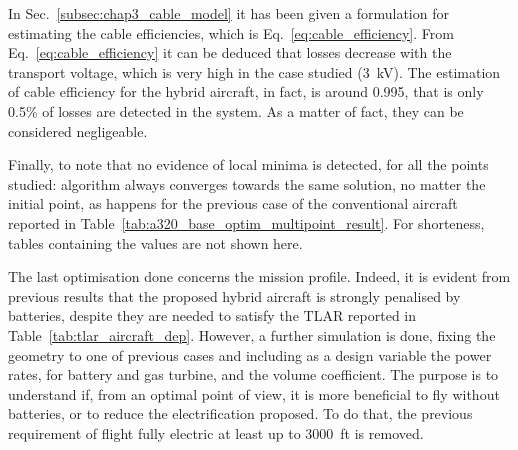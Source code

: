 In Sec.~\ref{subsec:chap3_cable_model} it has been given a formulation for estimating the cable efficiencies, which is Eq.~\eqref{eq:cable_efficiency}. 
From Eq.~\eqref{eq:cable_efficiency} it can be deduced that losses decrease with the transport voltage, which is very high in the case studied (3~\si{\kilo\volt}). 
The estimation of cable efficiency for the hybrid aircraft, in fact, is around 0.995, that is only 0.5\% of losses are detected in the system.
As a matter of fact, they can be considered negligeable. 

Finally, to note that no evidence of local minima is detected, for all the points studied: algorithm always converges towards the same solution, no matter the initial point, as happens for the previous case of the conventional aircraft reported in Table~\ref{tab:a320_base_optim_multipoint_result}. 
For shorteness, tables containing the values are not shown here. 

The last optimisation done concerns the mission profile.
Indeed, it is evident from previous results that the proposed hybrid aircraft is strongly penalised by batteries, despite they are needed to satisfy the TLAR reported in Table~\ref{tab:tlar_aircraft_dep}. 
However, a further simulation is done, fixing the geometry to one of previous cases and including as a design variable the power rates, for battery and gas turbine, and the volume coefficient.
The purpose is to understand if, from an optimal point of view, it is more beneficial to fly without batteries, or to reduce the electrification proposed. 
To do that, the previous requirement of flight fully electric at least up to 3000~ft is removed.

